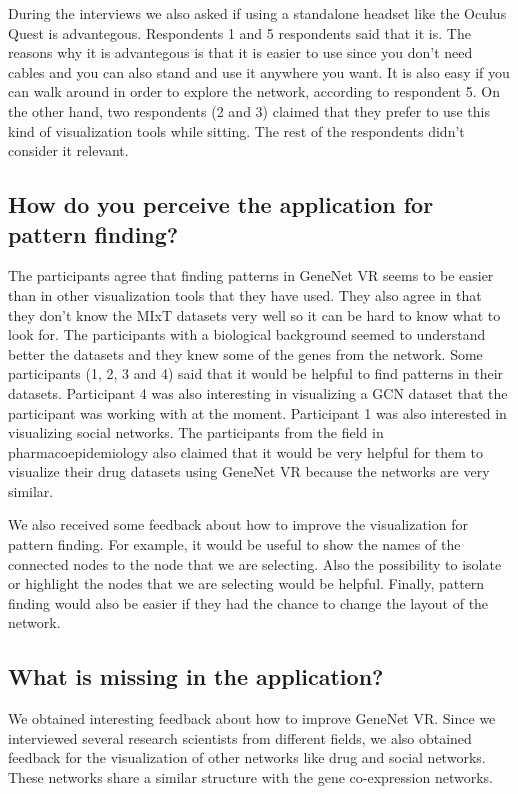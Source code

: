 During the interviews we also asked if using a standalone headset like the Oculus Quest is advantegous. Respondents 1 and 5 respondents said that it is. The reasons why it is advantegous is that it is easier to use since you don't need cables and you can also stand and use it anywhere you want. It is also easy if you can walk around in order to explore the network, according to respondent 5. On the other hand, two respondents (2 and 3) claimed that they prefer to use this kind of visualization tools while sitting. The rest of the respondents didn't consider it relevant.

\subsection{How do you perceive the application for pattern finding?}
The participants agree that finding patterns in GeneNet VR seems to be easier than in other visualization tools that they have used. They also agree in that they don't know the MIxT datasets very well so it can be hard to know what to look for. The participants with a biological background seemed to understand better the datasets and they knew some of the genes from the network. Some participants (1, 2, 3 and 4) said that it would be helpful to find patterns in their datasets. Participant 4 was also interesting in visualizing a GCN dataset that the participant was working with at the moment. Participant 1 was also interested in visualizing social networks. The participants from the field in pharmacoepidemiology also claimed that it would be very helpful for them to visualize their drug datasets using GeneNet VR because the networks are very similar.

We also received some feedback about how to improve the visualization for pattern finding. For example, it would be useful to show the names of the connected nodes to the node that we are selecting. Also the possibility to isolate or highlight the nodes that we are selecting would be helpful. Finally, pattern finding would also be easier if they had the chance to change the layout of the network.

\subsection{What is missing in the application?}
We obtained interesting feedback about how to improve GeneNet VR. Since we interviewed several research scientists from different fields, we also obtained feedback for the visualization of other networks like drug and social networks. These networks share a similar structure with the gene co-expression networks.

